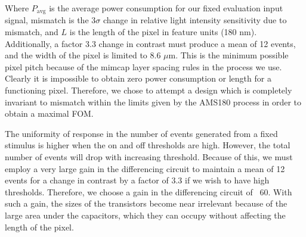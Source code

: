 Where \(P_{\text{avg}}\) is the average power consumption for our fixed evaluation input signal, mismatch is the 
\(3\sigma\) change in relative light intensity sensitivity due to mismatch, and \(L\) is the length of the pixel in feature units (180 nm).
Additionally, a factor 3.3 change in contrast must produce a mean of 12 events, and the width of the pixel is
limited to 8.6 \(\mu\)m. This is the minimum possible pixel pitch because of the mimcap layer spacing rules in the 
process we use.
Clearly it is impossible to obtain zero power consumption or length for a functioning pixel.
Therefore, we chose to attempt a design which is completely invariant to mismatch within the limits given by
the AMS180 process in order to obtain a maximal FOM. 

The uniformity of response in the number of events generated from a fixed stimulus is higher when the on and off
thresholds are high. However, the total number of events will drop with increasing threshold. 
Because of this, we must employ a very large gain in the differencing circuit to maintain a mean of 12 events
for a change in contrast by a factor of 3.3 if we wish to have high thresholds.
Therefore, we choose a gain in the differencing circuit of ~60. With such a gain, the sizes of the 
transistors become near irrelevant because of the large area under the capacitors, which they can occupy without
affecting the length of the pixel.


